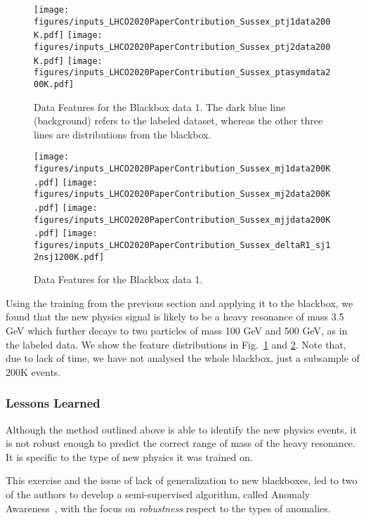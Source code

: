 \documentclass[a4paper,11pt]{article}
\begin{document}
\begin{figure}
\centering
\texttt{[image: figures/inputs\_LHCO2020PaperContribution\_Sussex\_ptj1data200K.pdf]}
\texttt{[image: figures/inputs\_LHCO2020PaperContribution\_Sussex\_ptj2data200K.pdf]}
\texttt{[image: figures/inputs\_LHCO2020PaperContribution\_Sussex\_ptasymdata200K.pdf]}
\caption{Data Features for the Blackbox data 1. The dark blue line (background) refers to the labeled dataset, whereas the other three lines are distributions from the blackbox.  \label{fig:np1}}
\end{figure}

\begin{figure}
\centering
\texttt{[image: figures/inputs\_LHCO2020PaperContribution\_Sussex\_mj1data200K.pdf]}
\texttt{[image: figures/inputs\_LHCO2020PaperContribution\_Sussex\_mj2data200K.pdf]}
\texttt{[image: figures/inputs\_LHCO2020PaperContribution\_Sussex\_mjjdata200K.pdf]}
\texttt{[image: figures/inputs\_LHCO2020PaperContribution\_Sussex\_deltaR1\_sj12nsj1200K.pdf]}
\caption{Data Features for the Blackbox data 1.\label{fig:np2}}
\end{figure}

Using the training from the previous section and applying it to the blackbox, we found that the new physics signal is likely to be a heavy resonance of mass 3.5 GeV which further decays to two particles of mass 100 GeV and 500 GeV, as in the labeled data. We show the feature distributions in Fig.~\ref{fig:np1} and \ref{fig:np2}. Note that, due to lack of time, we have not analysed the whole blackbox, just a subsample of 200K events.

\subsubsection{Lessons Learned}
\label{sec:lessons}


Although the method outlined above is able to identify the new physics events, it is not robust enough to predict the correct range of mass of the heavy resonance. It is specific to the type of new physics it was trained on. 

This exercise and the issue of lack of generalization to new blackboxes, led to two of the authors to develop a semi-supervised algorithm, called Anomaly Awareness~\cite{Khosa:2020qrz}, with the focus on {\it robustness} respect to the types of anomalies.  
\end{document}
